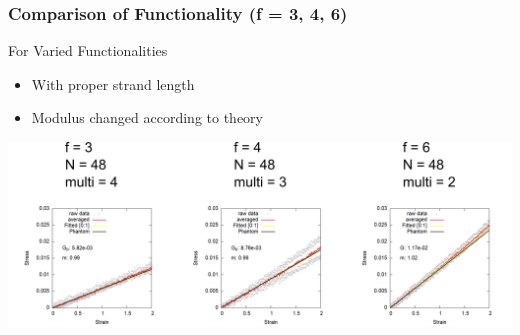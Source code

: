 \documentclass[12pt, dvipdfmx]{beamer}
\begin{document}
\begin{frame}
	\frametitle{
		Comparison of Functionality (f = 3, 4, 6)
	}

	\begin{block}{For Varied Functionalities}
		\begin{itemize}
			\item With proper strand length
			\item Modulus changed according to theory
		\end{itemize}

		\vspace{5mm}
		\centering
			\includegraphics[width=\textwidth]{compare_346.png}
	\end{block}

\end{frame}
\end{document}
